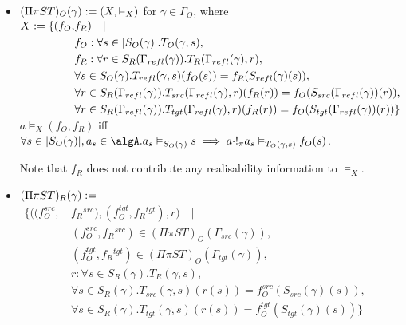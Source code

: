 \documentclass[12pt,a4paper]{article}
\def\src{_{src}}
\def\rfl{_{refl}}
\def\tgt{_{tgt}}
\renewcommand{\O}{_{O}}\alwaysmath{O}
\newcommand{\R}{\ensuremath{_{R}}}
\begin{document}
\begin{itemize}
  \item $(\Pi \pi S T)\O(\gamma) \define (X, \vDash_X)$ for $\gamma \in \Gamma\O$, where
    \subitem
        $\begin{aligned}
          X \define \{ (f\O,& f\R) \quad | \quad \\ 
          & f\O : \forall s \in |S\O(\gamma)|.T\O(\gamma, s),\\
          & f\R : \forall r \in S\R(\Gamma\rfl(\gamma)). T\R(\Gamma\rfl(\gamma), r),\\
          & \forall s \in S\O(\gamma). T\rfl(\gamma, s)(f\O(s)) = f\R(S\rfl(\gamma)(s)), \\
          & \forall r \in S\R(\Gamma\rfl(\gamma)). T\src(\Gamma\rfl(\gamma),r)(f\R (r)) = f\O(S\src(\Gamma\rfl(\gamma))(r)), \\
          & \forall r \in S\R(\Gamma\rfl(\gamma)). T\tgt(\Gamma\rfl(\gamma),r)(f\R (r)) = f\O(S\tgt(\Gamma\rfl(\gamma))(r))  \}
        \end{aligned}$\\
    
    \subitem $a \vDash_X (f\O, f\R)$ iff
    $\forall s \in |S\O(\gamma)|, a_s \in \algA . a_s \vDash_{S\O(\gamma)} s \implies a \cdot !_\pi a_s \vDash_{T\O(\gamma,s)} f\O(s)$.
    
    Note that $f\R$ does not contribute any realisability information to $\vDash_X$.
    
    \item  $(\Pi \pi S T)\R(\gamma) \define$
      \subitem 
        $\begin{aligned}
          \{( (f\O^{src}, \,& f\R^{src}), (f\O^{tgt}, f\R^{tgt}), r)  \quad|\quad \\
            & (f\O^{src},f\R^{src}) \in (\Pi\pi S T)\O(\Gamma\src(\gamma)),\\
            & (f\O^{tgt},f\R^{tgt}) \in (\Pi\pi S T)\O(\Gamma\tgt(\gamma)),\\
            & r : \forall s \in S\R(\gamma). T\R(\gamma, s),\\     
            & \forall s \in S\R(\gamma). T\src(\gamma, s)( r (s)) = f\O^{src}(S\src(\gamma)(s)),\\
            & \forall s \in S\R(\gamma). T\tgt(\gamma, s)( r (s)) = f\O^{tgt}(S\tgt(\gamma)(s)) \}
        \end{aligned}$
      
%     


\end{itemize}
\end{document}
